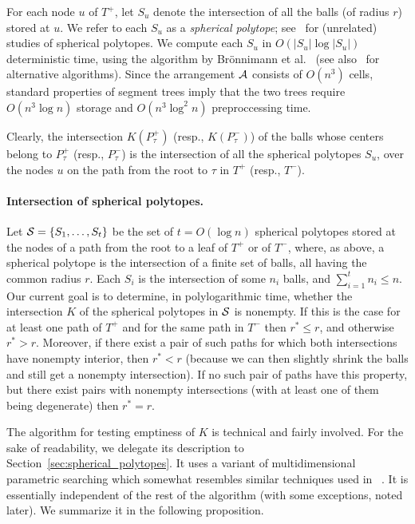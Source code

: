 \documentclass[a4paper,12pt]{article}
\def\A{{\cal A}}
\def\S{{\cal S}}
\begin{document}
For each node $u$ of $T^+$, let $S_u$ denote the intersection of all
the balls (of radius $r$) stored at $u$. We refer to each $S_u$ as a
\emph{spherical polytope}; see~\cite{BCT, BLNP, BN} for (unrelated)
studies of spherical polytopes. We compute each $S_u$ in $O(|S_u|
\log |S_u|)$ deterministic time, using the algorithm by
Br\"{o}nnimann et al.~\cite{BCM} (see also~\cite{CS, ER} for
alternative algorithms). Since the arrangement $\A$ consists of
$O(n^3)$ cells, standard properties of segment trees imply that the
two trees require $O(n^3 \log n)$ storage and $O(n^3 \log^2 n)$
preproccessing time.

Clearly, the intersection $K(P_\tau^+)$ (resp., $K(P_\tau^-)$) of
the balls whose centers belong to $P_\tau^+$ (resp., $P_\tau^-$) is
the intersection of all the spherical polytopes $S_u$, over the
nodes $u$ on the path from the root to $\tau$ in $T^+$ (resp.,
$T^-$).

\paragraph{Intersection of spherical polytopes.}
Let $\S = \{S_1,\ldots,S_t\}$ be the set of $t = O(\log n)$
spherical polytopes stored at the nodes of a path from the root to a
leaf of $T^+$ or of $T^-$, where, as above, a spherical polytope is
the intersection of a finite set of balls, all having the common
radius $r$. Each $S_i$ is the intersection of some $n_i$ balls, and
$\sum_{i=1}^t n_i \leq n$. Our current goal is to determine, in
polylogarithmic time, whether the intersection $K$ of the spherical
polytopes in $\S$ is nonempty. If this is the case for at least one
path of $T^+$ and for the same path in $T^-$ then $r^* \leq r$, and
otherwise $r^* >r$. Moreover, if there exist a pair of such paths
for which both intersections have nonempty interior, then $r^* < r$
(because we can then slightly shrink the balls and still get a
nonempty intersection). If no such pair of paths have this property,
but there exist pairs with nonempty intersections (with at least one
of them being degenerate) then $r^* = r$.

The algorithm for testing emptiness of $K$ is technical and fairly
involved. For the sake of readability, we delegate its description
to Section~\ref{sec:spherical_polytopes}. It uses a variant of
multidimensional parametric searching which somewhat resembles
similar techniques used in ~\cite{TCA, CMS, JM, NPT}. It is
essentially independent of the rest of the algorithm (with some
exceptions, noted later). We summarize it in the following
proposition.
\end{document}
